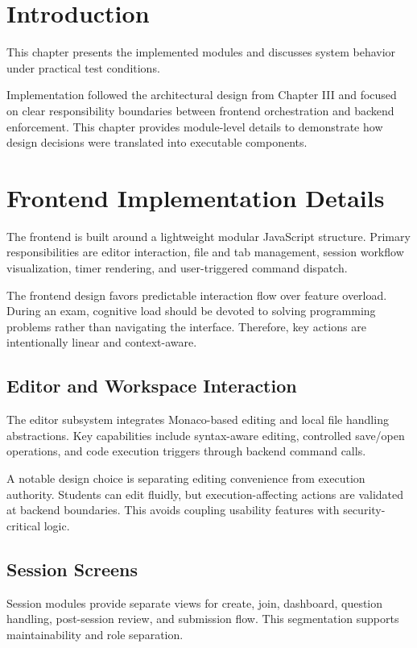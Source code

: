 \documentclass[12pt,a4paper]{report}
\begin{document}
	\section{Introduction}
	This chapter presents the implemented modules and discusses system behavior under practical test conditions.
	
	Implementation followed the architectural design from Chapter III and focused on clear responsibility boundaries between frontend orchestration and backend enforcement. This chapter provides module-level details to demonstrate how design decisions were translated into executable components.
	
	\section{Frontend Implementation Details}
	The frontend is built around a lightweight modular JavaScript structure. Primary responsibilities are editor interaction, file and tab management, session workflow visualization, timer rendering, and user-triggered command dispatch.
	
	The frontend design favors predictable interaction flow over feature overload. During an exam, cognitive load should be devoted to solving programming problems rather than navigating the interface. Therefore, key actions are intentionally linear and context-aware.
	
	\subsection{Editor and Workspace Interaction}
	The editor subsystem integrates Monaco-based editing and local file handling abstractions. Key capabilities include syntax-aware editing, controlled save/open operations, and code execution triggers through backend command calls.
	
	A notable design choice is separating editing convenience from execution authority. Students can edit fluidly, but execution-affecting actions are validated at backend boundaries. This avoids coupling usability features with security-critical logic.
	
	\subsection{Session Screens}
	Session modules provide separate views for create, join, dashboard, question handling, post-session review, and submission flow. This segmentation supports maintainability and role separation.
	
\end{document}
